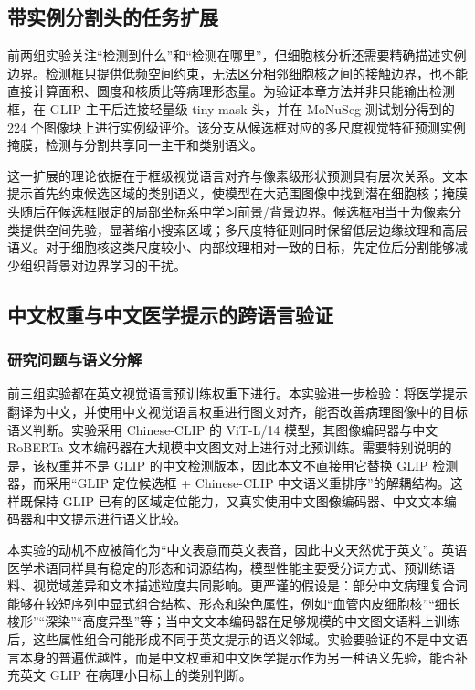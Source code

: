 \subsection{带实例分割头的任务扩展}

前两组实验关注“检测到什么”和“检测在哪里”，但细胞核分析还需要精确描述实例边界。检测框只提供低频空间约束，无法区分相邻细胞核之间的接触边界，也不能直接计算面积、圆度和核质比等病理形态量。为验证本章方法并非只能输出检测框，在 GLIP 主干后连接轻量级 tiny mask 头，并在 MoNuSeg 测试划分得到的 224 个图像块上进行实例级评价。该分支从候选框对应的多尺度视觉特征预测实例掩膜，检测与分割共享同一主干和类别语义。

这一扩展的理论依据在于框级视觉语言对齐与像素级形状预测具有层次关系。文本提示首先约束候选区域的类别语义，使模型在大范围图像中找到潜在细胞核；掩膜头随后在候选框限定的局部坐标系中学习前景/背景边界。候选框相当于为像素分类提供空间先验，显著缩小搜索区域；多尺度特征则同时保留低层边缘纹理和高层语义。对于细胞核这类尺度较小、内部纹理相对一致的目标，先定位后分割能够减少组织背景对边界学习的干扰。

\subsection{中文权重与中文医学提示的跨语言验证}

\subsubsection{研究问题与语义分解}

前三组实验都在英文视觉语言预训练权重下进行。本实验进一步检验：将医学提示翻译为中文，并使用中文视觉语言权重进行图文对齐，能否改善病理图像中的目标语义判断。实验采用 Chinese-CLIP 的 ViT-L/14 模型，其图像编码器与中文 RoBERTa 文本编码器在大规模中文图文对上进行对比预训练\cite{yang2022chineseclip}。需要特别说明的是，该权重并不是 GLIP 的中文检测版本，因此本文不直接用它替换 GLIP 检测器，而采用“GLIP 定位候选框 + Chinese-CLIP 中文语义重排序”的解耦结构。这样既保持 GLIP 已有的区域定位能力，又真实使用中文图像编码器、中文文本编码器和中文提示进行语义比较。

本实验的动机不应被简化为“中文表意而英文表音，因此中文天然优于英文”。英语医学术语同样具有稳定的形态和词源结构，模型性能主要受分词方式、预训练语料、视觉域差异和文本描述粒度共同影响。更严谨的假设是：部分中文病理复合词能够在较短序列中显式组合结构、形态和染色属性，例如“血管内皮细胞核”“细长梭形”“深染”“高度异型”等；当中文文本编码器在足够规模的中文图文语料上训练后，这些属性组合可能形成不同于英文提示的语义邻域。实验要验证的不是中文语言本身的普遍优越性，而是中文权重和中文医学提示作为另一种语义先验，能否补充英文 GLIP 在病理小目标上的类别判断。

